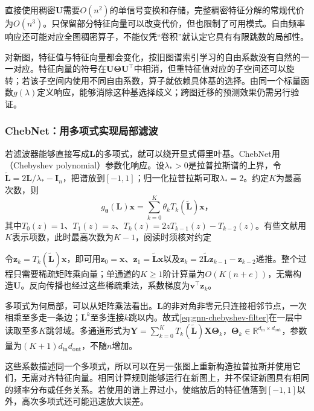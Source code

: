 直接使用稠密$\bm{U}$需要$O(n^2)$的单信号变换和存储，完整稠密特征分解的常规代价为$O(n^3)$。只保留部分特征向量可以改变代价，但也限制了可用模式。自由频率响应还可能对应全图稠密算子，不能仅凭“卷积”就认定它具有有限跳数的局部性。

对新图，特征值与特征向量都会变化，按旧图谱索引学习的自由系数没有自然的一一对应。特征向量的符号在$\bm{U}\bm{\Theta}\bm{U}^{\top}$中相消，但重特征值对应的子空间还可以旋转；若该子空间内使用不同自由系数，算子就依赖具体基的选择。由同一个标量函数$g(\lambda)$定义响应，能够消除这种基选择歧义；跨图迁移的预测效果仍需另行验证。

\subsubsection{ChebNet：用多项式实现局部滤波}
\label{sec:gnn-chebnet}

若滤波器能够直接写成$\bm{L}$的多项式，就可以绕开显式傅里叶基。ChebNet用（Chebyshev polynomial）参数化响应。设$\lambda_*>0$是拉普拉斯谱的上界，令$\widetilde{\bm{L}}=2\bm{L}/\lambda_*-\bm{I}_n$，把谱放到$[-1,1]$；归一化拉普拉斯可取$\lambda_*=2$。约定$K$为最高次数，则
\begin{equation}
  g_{\bm{\theta}}(\bm{L})\bm{x}
    =\sum_{k=0}^{K}\theta_k T_k(\widetilde{\bm{L}})\bm{x}\text{，}
  \label{eq:gnn-chebyshev-filter}
\end{equation}
其中$T_0(z)=1$、$T_1(z)=z$、$T_k(z)=2zT_{k-1}(z)-T_{k-2}(z)$。有些文献用$K$表示项数，此时最高次数为$K-1$，阅读时须核对约定

令$\bm{z}_k=T_k(\widetilde{\bm{L}})\bm{x}$，即可用$\bm{z}_0=\bm{x}$、$\bm{z}_1=\widetilde{\bm{L}}\bm{x}$以及$\bm{z}_k=2\widetilde{\bm{L}}\bm{z}_{k-1}-\bm{z}_{k-2}$递推。整个过程只需要稀疏矩阵乘向量；单通道的$K\geq1$阶计算量为$O(K(n+e))$，无需构造$\bm{U}$。反向传播也经过这些稀疏乘法，系数梯度为$\bm{v}^{\top}\bm{z}_k$。

多项式为何局部，可以从矩阵乘法看出。$\bm{L}$的非对角非零元只连接相邻节点，一次相乘至多走一条边；$\bm{L}^k$至多连接$k$跳以内。故式\eqref{eq:gnn-chebyshev-filter}在一层中读取至多$K$跳邻域。多通道形式为$\bm{Y}=\sum_{k=0}^{K}T_k(\widetilde{\bm{L}})\bm{X}\bm{\Theta}_k$，$\bm{\Theta}_k\in\mathbb{R}^{d_{\mathrm{in}}\times d_{\mathrm{out}}}$，参数量为$(K+1)d_{\mathrm{in}}d_{\mathrm{out}}$，不随$n$增加。

这些系数描述同一个多项式，所以可以在另一张图上重新构造拉普拉斯并使用它们，无需对齐特征向量。相同计算规则能够运行在新图上，并不保证新图具有相同的频率分布或任务关系。若使用的谱上界过小，使缩放后的特征值落到$[-1,1]$以外，高次多项式还可能迅速放大误差。

